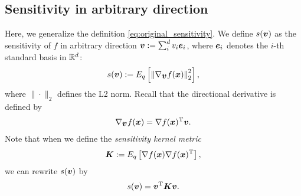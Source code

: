 \subsection{Sensitivity in arbitrary direction}
%
Here, we generalize the definition \eqref{eq:original_sensitivity}.
We define $s(\mbox{\boldmath $v$})$ as the sensitivity of $f$ in arbitrary direction $\mbox{\boldmath $v$} := \sum_{i}^{d} v_i
\mbox{\boldmath $e$}_i$, where $\mbox{\boldmath $e$}_i$ denotes the $i$-th standard basis in $\mathbb{R}^d$:
%
\begin{align}
\begin{split}
 s(\mbox{\boldmath $v$}) := E_q\left[ \left\| \nabla_{\mbox{\boldmath $v$}} f(\mbox{\boldmath $x$}) \right\|_2^2 \right],
\end{split} \label{eq:koyamada_sensitivity}
\end{align}
%
where $\|\cdot\|_2$ defines the L2 norm.
%
Recall that the directional derivative is defined by
\begin{align}
\begin{split}
\nabla_{\mbox{\boldmath $v$}} f(\mbox{\boldmath $x$}) = \nabla f(\mbox{\boldmath $x$})^{\mathrm{T}} \mbox{\boldmath $v$}.
\end{split}
\end{align}
%
Note that when we define the \textit{sensitivity kernel metric}
%
\begin{align}
\begin{split}
 \mbox{\boldmath $K$}:= E_q \left[
 \nabla f(\mbox{\boldmath $x$}) \nabla f(\mbox{\boldmath $x$})^{\mathrm{T}}
 \right],
\end{split}  \label{eq:koyamada_inner_p}
\end{align}
%
we can rewrite $s(\mbox{\boldmath $v$})$ by
%
\begin{align}
\begin{split}
 s(\mbox{\boldmath $v$}) = \mbox{\boldmath $v$}^{\mathrm{T}} \mbox{\boldmath $K$} \mbox{\boldmath $v$}.
\end{split} \label{eq:koyamada_metric}
\end{align}

